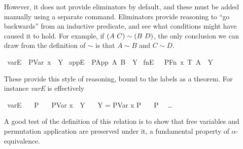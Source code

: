 However, it does not provide eliminators by default, and these must be added manually using a separate command.
Eliminators provide reasoning to ``go backwards'' from an inductive predicate, and see what conditions might have caused it to hold.
For example, if \(\left(A\ C\right) \sim \left(B\ D\right)\), the only conclusion we can draw from the definition of \(\sim\) is that \(A \sim B\) and \(C \sim D\).

\begin{implementation}
\isamarkupfalse%
\ varE{\isacharcolon}\ \ {\isachardoublequoteopen}PVar\ x\ {\isasymapprox}\ Y{\isachardoublequoteclose}\isanewline
{}\isamarkupfalse%
\ appE{\isacharcolon}\ \ {\isachardoublequoteopen}PApp\ A\ B\ {\isasymapprox}\ Y{\isachardoublequoteclose}\isanewline
{}\isamarkupfalse%
\ fnE{\isacharcolon}\ \ \ {\isachardoublequoteopen}PFn\ x\ T\ A\ {\isasymapprox}\ Y{\isachardoublequoteclose}\isanewline
\end{implementation}

These provide this style of reasoning, bound to the labels as a theorem.
For instance \emph{varE} is effectively

\begin{implementation}
\isamarkupfalse%
\ varE\isanewline
\ \ \ P\isanewline
\ \ \ {\isachardoublequoteopen}PVar x\ {\isasymapprox}\ Y{\isachardoublequoteclose}\isanewline
\ \ \ {\isachardoublequoteopen}Y = PVar x {\isasymLongrightarrow} P{\isachardoublequoteclose}\isanewline
\ \ \ {\isachardoublequoteopen}P{\isachardoublequoteclose}\isanewline
{}\isanewline
\ \ \ldots\isanewline
{}\isanewline
\end{implementation}

A good test of the definition of this relation is to show that free variables and permutation application are preserved under it, a fundamental property of \(\alpha\)-equivalence.

